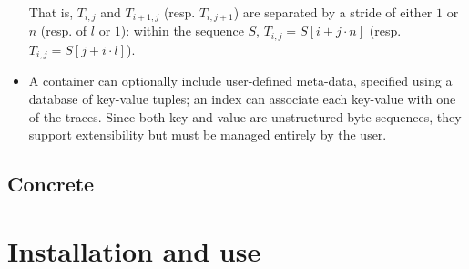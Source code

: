 \documentclass[10pt,a4paper]{llncs}
\begin{document}
\begin{itemize}
      \noindent
      That is, $T_{i,j}$ and $T_{i+1,j}$ (resp. $T_{i,j+1}$) are separated 
      by a stride of either $1$ or $n$ (resp. of $l$ or $1$): within the 
      sequence $S$, $T_{i,j} = S[ i + j \cdot n ]$ (resp. $T_{i,j} = S[ j 
      + i \cdot l ]$).
\item A container can optionally include user-defined meta-data, specified
      using a database of key-value tuples; an index can associate each 
      key-value with one of the traces.  Since both key and value are 
      unstructured byte sequences, they support extensibility but must be 
      managed entirely by the user.
\end{itemize}


\subsection{Concrete}


\section{Installation and use}


\end{document}
